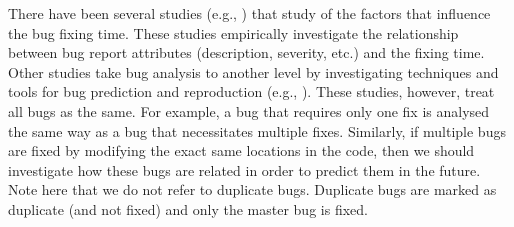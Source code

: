 There have been several studies (e.g., \cite{Weiß2007, Zhang2013}) that study of the factors that influence the bug fixing time.
These studies   empirically investigate the relationship between bug report attributes (description, severity, etc.) and the fixing time. Other studies take bug analysis to another level by investigating techniques and tools for bug prediction and reproduction (e.g., \cite{Chen2013, Kim2007a, Nayrolles2015}). These studies, however, treat all bugs as the same.
For example, a bug that requires only one fix is analysed the same way as a bug that necessitates multiple fixes.
Similarly, if multiple bugs are fixed by modifying the exact same locations in the code, then we should investigate how these bugs are related in order to predict them in the future. Note here that we do not refer to duplicate bugs. Duplicate bugs are marked as duplicate (and not fixed) and only the master bug is fixed.

